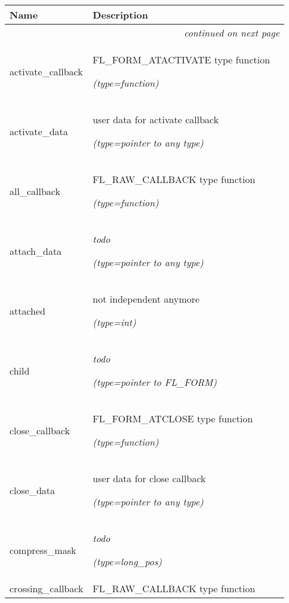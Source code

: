     \vspace{-1cm}
\hspace{\varindent}\begin{longtable}{|p{\varnamewidth}|p{\vardescrwidth}|l}
\cline{1-2}
\cline{1-2} \centering \textbf{Name} & \centering \textbf{Description}& \\
\cline{1-2}
\endhead\cline{1-2}\multicolumn{3}{r}{\small\textit{continued on next page}}\\\endfoot\cline{1-2}
\endlastfoot\raggedright a\-c\-t\-i\-v\-a\-t\-e\-\_\-c\-a\-l\-l\-b\-a\-c\-k\- & \raggedright FL\_FORM\_ATACTIVATE type function

            {\it (type=function)}&\\
\cline{1-2}
\raggedright a\-c\-t\-i\-v\-a\-t\-e\-\_\-d\-a\-t\-a\- & \raggedright user data for activate callback

            {\it (type=pointer to any type)}&\\
\cline{1-2}
\raggedright a\-l\-l\-\_\-c\-a\-l\-l\-b\-a\-c\-k\- & \raggedright FL\_RAW\_CALLBACK type function

            {\it (type=function)}&\\
\cline{1-2}
\raggedright a\-t\-t\-a\-c\-h\-\_\-d\-a\-t\-a\- & \raggedright \emph{todo}

            {\it (type=pointer to any type)}&\\
\cline{1-2}
\raggedright a\-t\-t\-a\-c\-h\-e\-d\- & \raggedright not independent anymore

            {\it (type=int)}&\\
\cline{1-2}
\raggedright c\-h\-i\-l\-d\- & \raggedright \emph{todo}

            {\it (type=pointer to FL\_FORM)}&\\
\cline{1-2}
\raggedright c\-l\-o\-s\-e\-\_\-c\-a\-l\-l\-b\-a\-c\-k\- & \raggedright FL\_FORM\_ATCLOSE type function

            {\it (type=function)}&\\
\cline{1-2}
\raggedright c\-l\-o\-s\-e\-\_\-d\-a\-t\-a\- & \raggedright user data for close callback

            {\it (type=pointer to any type)}&\\
\cline{1-2}
\raggedright c\-o\-m\-p\-r\-e\-s\-s\-\_\-m\-a\-s\-k\- & \raggedright \emph{todo}

            {\it (type=long\_pos)}&\\
\cline{1-2}
\raggedright c\-r\-o\-s\-s\-i\-n\-g\-\_\-c\-a\-l\-l\-b\-a\-c\-k\- & \raggedright FL\_RAW\_CALLBACK type function


\end{longtable}
